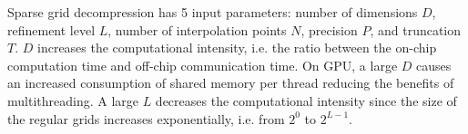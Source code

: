 Sparse grid decompression has 5 input parameters: number of dimensions $D$,
refinement level $L$, number of interpolation points $N$, precision $P$, and
truncation $T$. $D$ increases the computational intensity, i.e. the ratio
between the on-chip computation time and off-chip communication time. On GPU, a
large $D$ causes an increased consumption of shared memory per thread reducing
the benefits of multithreading. A large $L$ decreases the computational
intensity since the size of the regular grids increases exponentially, i.e. from
$2^0$ to $2^{L-1}$.
